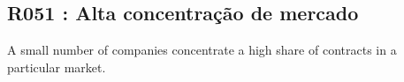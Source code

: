 %

\subsection{R051 : Alta concentração de mercado}

\Lemma{}
{A small number of companies concentrate a high share of contracts in a particular market.}



